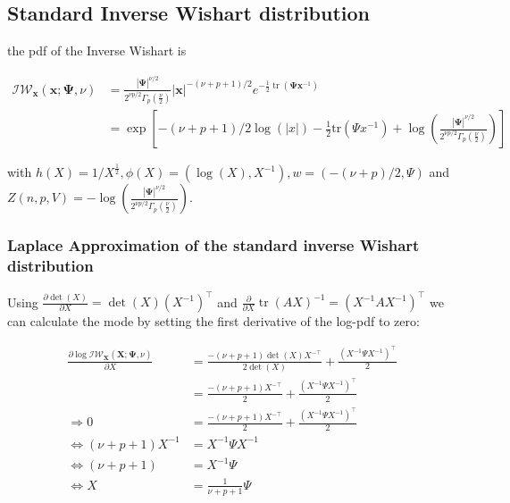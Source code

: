 \subsection{Standard Inverse Wishart distribution}

the pdf of the Inverse Wishart is

\begin{subequations}
\begin{align}
\mathcal{IW}_{\mathbf x}({\mathbf x}; {\mathbf \Psi}, \nu) &= \frac{\left|{\mathbf\Psi}\right|^{\nu/2}}{2^{\nu p/2}\Gamma_p(\frac \nu 2)} \left|\mathbf{x}\right|^{-(\nu+p+1)/2} e^{-\frac{1}{2}\operatorname{tr}(\mathbf\Psi\mathbf{x}^{-1})}
\label{eq:inverse_wishart_pdf} \\
&= \exp \left[-(\nu + p + 1)/2 \log(|x|) - \frac{1}{2} \text{tr}(\Psi x^{-1}) + \log(\frac{\left|{\mathbf\Psi}\right|^{\nu/2}}{2^{\nu p/2}\Gamma_p(\frac \nu 2)}) \right]
\end{align}
\end{subequations}

with $h(X) = 1/X^\frac{1}{2}, \phi(X)=(\log(X), X^{-1}), w=(-(\nu+p)/2, \Psi)$ and $Z(n,p,V)=- \log(\frac{\left|{\mathbf\Psi}\right|^{\nu/2}}{2^{\nu p/2}\Gamma_p(\frac \nu 2)})$.

\subsubsection{Laplace Approximation of the standard inverse Wishart distribution}

Using $\frac{\partial \det(X)}{\partial X} = \det(X)(X^{-1})^\top$ and $\frac{\partial}{\partial X} \operatorname{tr}(AX)^{-1} = (X^{-1}AX^{-1})^\top$ we can calculate the mode by setting the first derivative of the log-pdf to zero:

\begin{subequations}
\begin{align}
	\frac{\partial \log \mathcal{IW}_{\mathbf X}({\mathbf X}; {\mathbf \Psi}, \nu)}{\partial X} &= \frac{-(\nu + p + 1) \det(X) X^{-\top}}{2\det(X)} + \frac{(X^{-1} \Psi X^{-1})^\top}{2} \\
	&=\frac{-(\nu + p + 1) X^{-\top}}{2} + \frac{(X^{-1} \Psi X^{-1})^\top}{2} \\
	\Rightarrow 0 &=\frac{-(\nu + p + 1) X^{-\top}}{2} + \frac{(X^{-1} \Psi X^{-1})^\top}{2} \\
	\Leftrightarrow (\nu + p + 1) X^{-1} &= X^{-1} \Psi X^{-1} \\
	\Leftrightarrow (\nu + p + 1) &= X^{-1} \Psi\\
	\Leftrightarrow X &= \frac{1}{\nu + p + 1} \Psi
\end{align}
\end{subequations}

